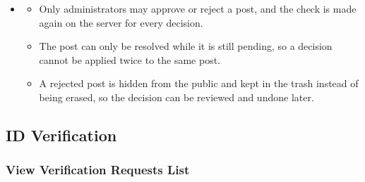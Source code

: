 \begin{itemize}[leftmargin=1.6em,topsep=4pt,itemsep=3pt,parsep=0pt,label=$\bullet$]
\begin{itemize}[leftmargin=2.2em,topsep=2pt,itemsep=3pt,parsep=0pt,label=$\circ$]
            \item \textbf{Item Not Found}: When the post has already been resolved by another administrator, the action fails and the screen shows the message ``Couldn't approve post. Try again.'' or ``Couldn't reject post. Try again.''.
            \item \textbf{Cannot Save the Decision}: When the decision cannot be saved, the post stays in the queue and a message asks the administrator to try again.
            \item \textbf{Lost Connection}: When the connection to the server is lost, the decision is not applied and the screen asks the user to try again.
        \end{itemize}
    \item {}
        \begin{itemize}[leftmargin=2.2em,topsep=2pt,itemsep=3pt,parsep=0pt,label=$\circ$]
            \item Only administrators may approve or reject a post, and the check is made again on the server for every decision.
            \item The post can only be resolved while it is still pending, so a decision cannot be applied twice to the same post.
            \item A rejected post is hidden from the public and kept in the trash instead of being erased, so the decision can be reviewed and undone later.
        \end{itemize}
\end{itemize}



\subsection{ID Verification}

\subsubsection{View Verification Requests List}

